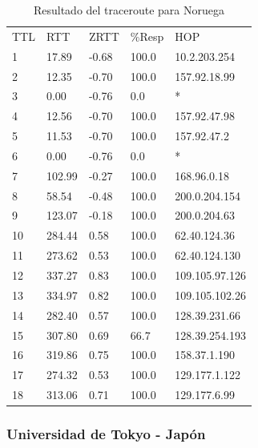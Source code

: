 \begin{table}[H]
    \begin{tabular}{lllll}
     TTL &  RTT     &  ZRTT         &   \%Resp       &  HOP            \\
    1    & 17.89    &  -0.68        &  100.0         &  10.2.203.254   \\
    2    & 12.35    &  -0.70        &  100.0         &  157.92.18.99   \\
    3    & 0.00     &  -0.76        &  0.0           &  *              \\
    4    & 12.56    &  -0.70        &  100.0         &  157.92.47.98   \\
    5    & 11.53    &  -0.70        &  100.0         &  157.92.47.2    \\
    6    & 0.00     &  -0.76        &  0.0           &  *              \\
    7    & 102.99   &   -0.27       &  100.0         &  168.96.0.18    \\
    8    & 58.54    &  -0.48        &  100.0         &  200.0.204.154  \\
    9    & 123.07   &   -0.18       &  100.0         &  200.0.204.63   \\
    10   &   284.44 &   0.58        &   100.0        &  62.40.124.36   \\
    11   &   273.62 &   0.53        &   100.0        &  62.40.124.130  \\
    12   &   337.27 &   0.83        &   100.0        &  109.105.97.126 \\
    13   &   334.97 &   0.82        &   100.0        &  109.105.102.26 \\
    14   &   282.40 &   0.57        &   100.0        &  128.39.231.66  \\
    15   &   307.80 &   0.69        &   66.7         &  128.39.254.193 \\
    16   &   319.86 &   0.75        &   100.0        &  158.37.1.190   \\
    17   &   274.32 &   0.53        &   100.0        &  129.177.1.122  \\
    18   &   313.06 &   0.71        &   100.0        &  129.177.6.99   \\
    \end{tabular}
    \caption{Resultado del traceroute para Noruega}
  \label{fig:tabla-nor}
\end{table}

\subsubsection{Universidad de Tokyo - Japón}

